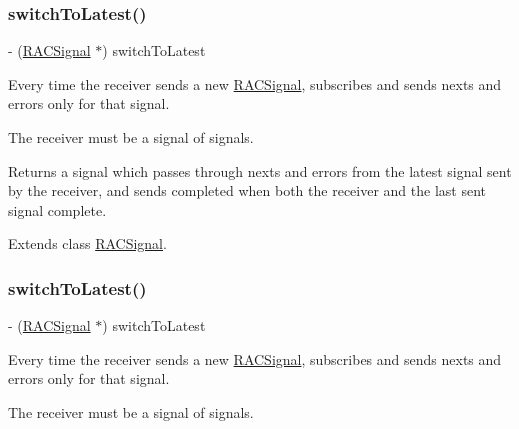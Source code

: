 \subsubsection{\texorpdfstring{switch\+To\+Latest()}{switchToLatest()}\hspace{0.1cm}{\footnotesize\ttfamily [2/3]}}
{\footnotesize\ttfamily -\/ (\mbox{\hyperlink{interface_r_a_c_signal}{R\+A\+C\+Signal}} $\ast$) switch\+To\+Latest \begin{DoxyParamCaption}{ }\end{DoxyParamCaption}}

Every time the receiver sends a new \mbox{\hyperlink{interface_r_a_c_signal}{R\+A\+C\+Signal}}, subscribes and sends {\ttfamily next}s and {\ttfamily error}s only for that signal.

The receiver must be a signal of signals.

Returns a signal which passes through {\ttfamily next}s and {\ttfamily error}s from the latest signal sent by the receiver, and sends {\ttfamily completed} when both the receiver and the last sent signal complete. 

Extends class \mbox{\hyperlink{interface_r_a_c_signal_a0a6780c4580e1a5338a9a891f7c69ea1}{R\+A\+C\+Signal}}.

\mbox{\label{category_r_a_c_signal_07_operations_08_a0a6780c4580e1a5338a9a891f7c69ea1}} 
\subsubsection{\texorpdfstring{switch\+To\+Latest()}{switchToLatest()}\hspace{0.1cm}{\footnotesize\ttfamily [3/3]}}
{\footnotesize\ttfamily -\/ (\mbox{\hyperlink{interface_r_a_c_signal}{R\+A\+C\+Signal}} $\ast$) switch\+To\+Latest \begin{DoxyParamCaption}{ }\end{DoxyParamCaption}}

Every time the receiver sends a new \mbox{\hyperlink{interface_r_a_c_signal}{R\+A\+C\+Signal}}, subscribes and sends {\ttfamily next}s and {\ttfamily error}s only for that signal.

The receiver must be a signal of signals.

